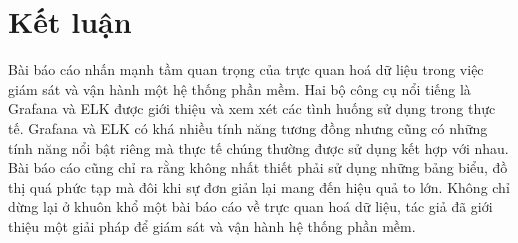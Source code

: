 \chapter{Kết luận}
Bài báo cáo nhấn mạnh tầm quan trọng của trực quan hoá dữ liệu trong việc giám sát và vận hành một hệ thống phần mềm. Hai bộ công cụ nổi tiếng là Grafana và ELK được giới thiệu và xem xét các tình huống sử dụng trong thực tế. Grafana và ELK có khá nhiều tính năng tương đồng nhưng cũng có những tính năng nổi bật riêng mà thực tế chúng thường được sử dụng kết hợp với nhau. Bài báo cáo cũng chỉ ra rằng không nhất thiết phải sử dụng những bảng biểu, đồ thị quá phức tạp mà đôi khi sự đơn giản lại mang đến hiệu quả to lớn. Không chỉ dừng lại ở khuôn khổ một bài báo cáo về trực quan hoá dữ liệu, tác giả đã giới thiệu một giải pháp để giám sát và vận hành hệ thống phần mềm.